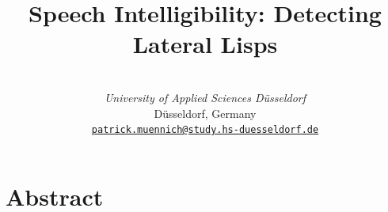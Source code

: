 \documentclass{IEEEtran}
\begin{document}
\title{Speech Intelligibility: Detecting Lateral Lisps}
\date{}
\author{\\
\textit{University of Applied Sciences D\"usseldorf}\\
D\"usseldorf, Germany \\
\href{mailto:patrick.muennich@study.hs-duesseldorf.de}{\texttt{patrick.muennich@study.hs-duesseldorf.de}}}
\maketitle

\section{Abstract}
\end{document}
